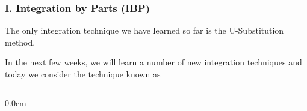 %
%
%
\begin{frame}
\frametitle{I. Integration by Parts (IBP)}
\scriptsize
\vspace{0.2cm}

The only integration technique we have learned so far is the U-Substitution method.  \\

\vspace{0.8cm}

In the next few weeks, we will learn a number of new integration techniques and today we consider the technique known as \\

\vspace{1.2cm}

\begin{columns}\begin{column}{0.0cm}\end{column}\end{columns}

\vspace{2.2cm}
\end{frame}

